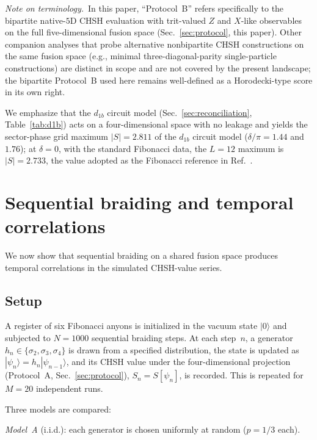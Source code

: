 \documentclass[aps,pra,twocolumn,superscriptaddress,longbibliography,floatfix,nofootinbib]{revtex4-2}
\begin{document}
\textit{Note on terminology.}\, In this paper, ``Protocol~B'' refers
specifically to the bipartite native-$5$D CHSH evaluation with
trit-valued $Z$ and $X$-like observables on the full five-dimensional
fusion space (Sec.~\ref{sec:protocol}, this paper). Other companion
analyses that probe alternative nonbipartite CHSH constructions on
the same fusion space (e.g., minimal three-diagonal-parity
single-particle constructions) are distinct in scope and are not
covered by the present landscape; the bipartite Protocol~B used here
remains well-defined as a Horodecki-type score in its own right.

We emphasize that the $d_{1b}$ circuit model
(Sec.~\ref{sec:reconciliation}, Table~\ref{tab:d1b}) acts on a
four-dimensional space with no leakage and yields the sector-phase grid
maximum $|S|=2.811$ of the $d_{1b}$ circuit model ($\delta/\pi = 1.44$
and $1.76$); at $\delta = 0$, with the standard Fibonacci data, the $L =
12$ maximum is $|S| = 2.733$, the value adopted as the Fibonacci
reference in Ref.~\cite{Sayim2026topological}.

\section{Sequential braiding and temporal correlations}
\label{sec:sequential}

We now show that sequential braiding on a shared fusion space produces
temporal correlations in the simulated CHSH-value series.

\subsection{Setup}

A register of six Fibonacci anyons is initialized in the vacuum state
$|0\rangle$ and subjected to $N=1000$ sequential braiding steps.
At each step~$n$, a generator $h_n\in\{\sigma_2,\sigma_3,\sigma_4\}$ is
drawn from a specified distribution, the state is updated as
$|\psi_n\rangle = h_n|\psi_{n-1}\rangle$, and its CHSH value under the
four-dimensional projection (Protocol~A, Sec.~\ref{sec:protocol}), $S_n =
S[\psi_n]$, is recorded.
This is repeated for $M=20$ independent runs.

Three models are compared:

\emph{Model~A} (i.i.d.):
each generator is chosen uniformly at random ($p=1/3$ each).
\end{document}
